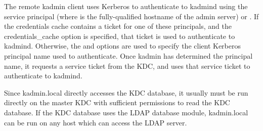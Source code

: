 \documentclass[letterpaper,10pt,english]{sphinxmanual}
\begin{document}
The remote kadmin client uses Kerberos to authenticate to kadmind
using the service principal  (where  is
the fully-qualified hostname of the admin server) or .
If the credentials cache contains a ticket for one of these
principals, and the  credentials\_cache option is specified, that
ticket is used to authenticate to kadmind.  Otherwise, the  and
 options are used to specify the client Kerberos principal name
used to authenticate.  Once kadmin has determined the principal name,
it requests a service ticket from the KDC, and uses that service
ticket to authenticate to kadmind.

Since kadmin.local directly accesses the KDC database, it usually must
be run directly on the master KDC with sufficient permissions to read
the KDC database.  If the KDC database uses the LDAP database module,
kadmin.local can be run on any host which can access the LDAP server.
\end{document}
